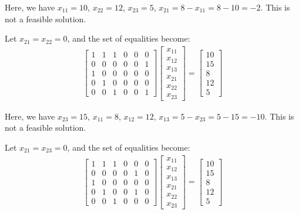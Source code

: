 \documentclass[letter,12pt]{article}
\begin{document}
Here, we have $x_{11} = 10$, $x_{22} = 12$, $x_{23} = 5$, $x_{21} = 8 - x_{11} = 8 - 10 = -2$. This is not a feasible solution.



Let $x_{21} = x_{22} = 0$, and the set of equalities become:
\begin{eqnarray*}
\left[
\begin{array}{cccccc}
1 & 1 & 1 & 0 & 0 & 0 \\
0 & 0 & 0 & 0 & 0 & 1 \\
1 & 0 & 0 & 0 & 0 & 0 \\
0 & 1 & 0 & 0 & 0 & 0 \\
0 & 0 & 1 & 0 & 0 & 1
\end{array}
\right]
\left[
\begin{array}{cccccc}
x_{11} \\
x_{12} \\
x_{13} \\
x_{21} \\
x_{22} \\
x_{23}
\end{array}
\right]
=
\left[
\begin{array}{cccccc}
10 \\
15 \\
8 \\
12 \\
5
\end{array}
\right]\end{eqnarray*}

Here, we have $x_{23} = 15$, $x_{11} = 8$, $x_{12} = 12$, $x_{13} = 5 - x_{23} = 5 - 15 = -10$. This is not a feasible solution.




Let $x_{21} = x_{23} = 0$, and the set of equalities become:
\begin{eqnarray*}
\left[
\begin{array}{cccccc}
1 & 1 & 1 & 0 & 0 & 0 \\
0 & 0 & 0 & 0 & 1 & 0 \\
1 & 0 & 0 & 0 & 0 & 0 \\
0 & 1 & 0 & 0 & 1 & 0 \\
0 & 0 & 1 & 0 & 0 & 0
\end{array}
\right]
\left[
\begin{array}{cccccc}
x_{11} \\
x_{12} \\
x_{13} \\
x_{21} \\
x_{22} \\
x_{23}
\end{array}
\right]
=
\left[
\begin{array}{cccccc}
10 \\
15 \\
8 \\
12 \\
5
\end{array}
\right]\end{eqnarray*}
\end{document}
